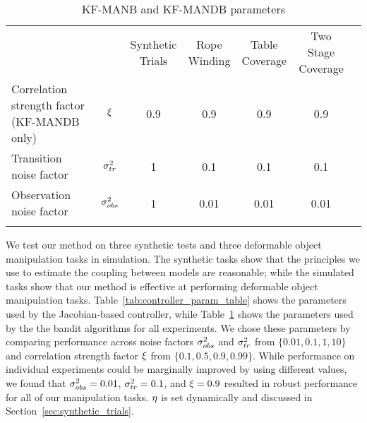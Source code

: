 \begin{table}[t]
\centering
\caption{KF-MANB and KF-MANDB parameters}
\label{tab:param_table}
\begin{tabular}{lcccccc}
\hline\noalign{\smallskip}
                                                            &                               & \makecell{Synthetic\\Trials} 
                                                                                            & \makecell{Rope\\Winding}
                                                                                            & \makecell{Table\\Coverage}
                                                                                            & \makecell{Two Stage\\Coverage} \\
\noalign{\smallskip}\hline\noalign{\smallskip}
\makecell[l]{Correlation strength factor\\(KF-MANDB only)}  & $\xi$          &  0.9 &   0.9 &   0.9 &   0.9 \\
\noalign{\smallskip}
Transition noise factor                                     & $\sigma_{tr}^2$    &    1 &   0.1 &   0.1 &   0.1 \\
\noalign{\smallskip}
Observation noise factor                                    & $\sigma_{obs}^2$   &    1 &  0.01 &  0.01 &  0.01 \\
\noalign{\smallskip}\hline
\end{tabular}
\end{table}

We test our method on three synthetic tests and three deformable object manipulation tasks in simulation. The synthetic tasks show that the principles we use to estimate the coupling between models are reasonable; while the simulated tasks show that our method is effective at performing deformable object manipulation tasks. Table~\ref{tab:controller_param_table} shows the parameters used by the Jacobian-based controller, while Table~\ref{tab:param_table} shows the parameters used by the the bandit algorithms for all experiments. We chose these parameters by comparing performance across noise factors $\sigma_{obs}^2$ and $\sigma_{tr}^2$ from $\{0.01, 0.1, 1, 10\}$ and correlation strength factor $\xi$ from $\{0.1, 0.5, 0.9, 0.99\}$. While performance on individual experiments could be marginally improved by using different values, we found that $\sigma_{obs}^2=0.01$, $\sigma_{tr}^2=0.1$, and $\xi=0.9$ resulted in robust performance for all of our manipulation tasks. $\eta$ is set dynamically and discussed in Section~\ref{sec:synthetic_trials}.



